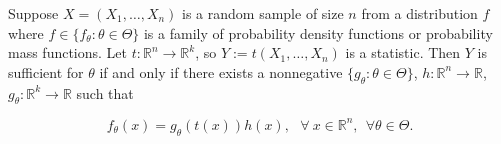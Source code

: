 \begin{theorem}\label{mathstats.factorization.thm} Suppose \(X = (X_1, \ldots, X_n)\) is a random sample of size \(n\) from a distribution \(f\) where \(f \in \{f_\theta: \theta \in \Theta\}\) is a family of probability density functions or probability mass functions.  Let \(t: \mathbb{R}^n \to \mathbb{R}^k\), so \(Y:= t(X_1, \ldots, X_n)\) is a statistic. Then \(Y\) is sufficient for \(\theta\) if and only if there exists a nonnegative \(\{g_\theta: \theta \in \Theta\}\), \(h: \mathbb{R}^n \to \mathbb{R}\), \(g_\theta: \mathbb{R}^k \to \mathbb{R}\) such that

\begin{equation}\label{mathstats.factorization.thm.eqn}
f_\theta(x) = g_\theta(t(x)) h(x), \ \ \ \forall \ x \in \mathbb{R}^n, \ \ \forall \theta \in \Theta.
\end{equation}


\end{theorem}

